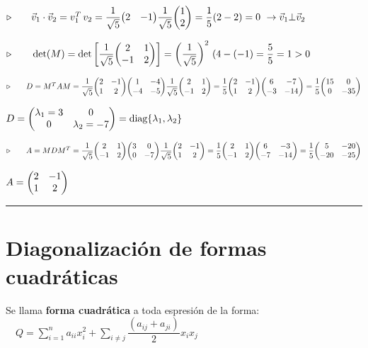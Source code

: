 $\triangleright \qquad \vec v_1\cdot \vec v_2=v_1^T \, v_2 = \dfrac 1{\sqrt{5}}\mqty(2&-1) \dfrac 1{\sqrt{5}} \mqty(1\\2)=\dfrac 1 5 (2-2)=0\ \to \vec v_1 \bot \vec v_2$

$\triangleright \qquad  \det(M)=\det \left[ \dfrac 1{\sqrt{5}} \mqty(2&1\\-1&2) \right] = \left( \dfrac 1{\sqrt{5}} \right)^2 \, (4-(-1)=\dfrac 5 5 =1>0$

$\triangleright \qquad  D=M^TAM= \dfrac 1{\sqrt{5}} \mqty(2&-1\\1&2) 
\mqty(1&-4\\-4&-5)
\dfrac 1{\sqrt{5}} \mqty(2&1\\-1&2)=
\dfrac 1 5 \mqty(2&-1\\1&2) 
\mqty(6&-7\\-3&-14)=\dfrac 1 5 \mqty(15&0\\0&-35)$

$D=\mqty(\lambda_1=3&0\\0&\lambda_2=-7)=\text{diag}\{\lambda_1,\lambda_2\}$

$\triangleright \qquad  A=MDM^T=\dfrac 1{\sqrt{5}} \mqty(2&1\\-1&2) \mqty(3&0\\0&-7) \dfrac 1{\sqrt{5}} \mqty(2&-1\\1&2)=\dfrac 1 5 \mqty(2&1\\-1&2) \mqty(6&-3\\-7&-14)=\dfrac 1 5 \mqty(5&-20\\-20&-25)$

$A=\mqty(2&-1\\1&2)$

\begin{center}
	\rule{200pt}{0.1pt}
\end{center}

\color{black}


\vspace{5mm}

\section{Diagonalización de formas cuadráticas}

Se llama \textbf{forma cuadrática} a toda espresión de la forma:
$\quad Q=\displaystyle \sum_{i=1}^n a_{ii}x_i^2 + \sum_{i\neq j} \dfrac{(a_{ij}+a_{ji})}{2} x_ix_j$

